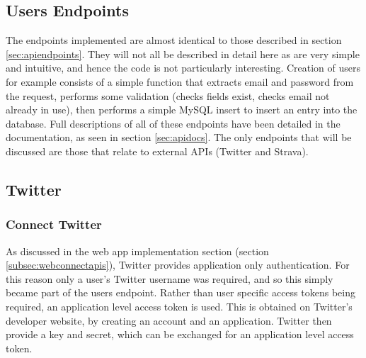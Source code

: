 \documentclass[11pt,openright,a4paper]{report}
\begin{document}
\subsection{Users Endpoints} \label{sec:apiimplusers}
The endpoints implemented are almost identical to those described in section \ref{sec:apiendpoints}. They will not all be described in detail here as are very simple and intuitive, and hence the code is not particularly interesting. Creation of users for example consists of a simple function that extracts email and password from the request, performs some validation (checks fields exist, checks email not already in use), then performs a simple MySQL insert to insert an entry into the database. Full descriptions of all of these endpoints have been detailed in the documentation, as seen in section \ref{sec:apidocs}. The only endpoints that will be discussed are those that relate to external APIs (Twitter and Strava).

\subsection{Twitter} \label{sec:apiconnecttwitter}
\subsubsection{Connect Twitter}
As discussed in the web app implementation section (section \ref{subsec:webconnectapis}), Twitter provides application only authentication. For this reason only a user's Twitter username was required, and so this simply became part of the users endpoint. Rather than user specific access tokens being required, an application level access token is used. This is obtained on Twitter's developer website, by creating an account and an application. Twitter then provide a key and secret, which can be exchanged for an application level access token.
\end{document}
